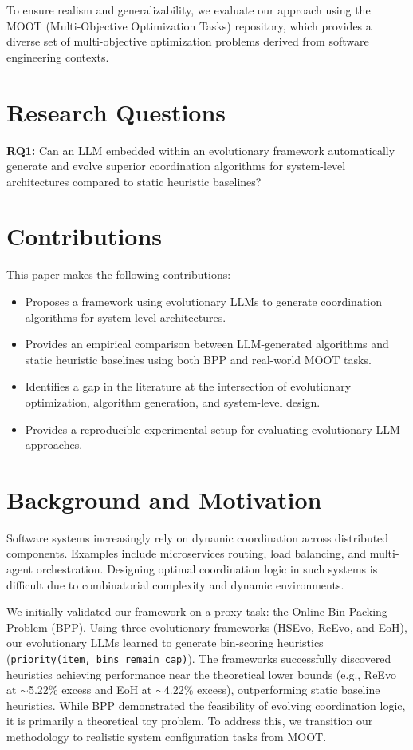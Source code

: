 \documentclass[sigconf,nonacm]{acmart}
\begin{document}
To ensure realism and generalizability, we evaluate our approach using the MOOT (Multi-Objective Optimization Tasks) repository, which provides a diverse set of multi-objective optimization problems derived from software engineering contexts.

\section{Research Questions}

\textbf{RQ1:} Can an LLM embedded within an evolutionary framework automatically generate and evolve superior coordination algorithms for system-level architectures compared to static heuristic baselines?

\section{Contributions}

This paper makes the following contributions:
\begin{itemize}
\item Proposes a framework using evolutionary LLMs to generate coordination algorithms for system-level architectures.
\item Provides an empirical comparison between LLM-generated algorithms and static heuristic baselines using both BPP and real-world MOOT tasks.
\item Identifies a gap in the literature at the intersection of evolutionary optimization, algorithm generation, and system-level design.
\item Provides a reproducible experimental setup for evaluating evolutionary LLM approaches.
\end{itemize}

\section{Background and Motivation}

Software systems increasingly rely on dynamic coordination across distributed components. Examples include microservices routing, load balancing, and multi-agent orchestration. Designing optimal coordination logic in such systems is difficult due to combinatorial complexity and dynamic environments.

We initially validated our framework on a proxy task: the Online Bin Packing Problem (BPP). Using three evolutionary frameworks (HSEvo, ReEvo, and EoH), our evolutionary LLMs learned to generate bin-scoring heuristics (\texttt{priority(item, bins\_remain\_cap)}). The frameworks successfully discovered heuristics achieving performance near the theoretical lower bounds (e.g., ReEvo at $\sim$5.22\% excess and EoH at $\sim$4.22\% excess), outperforming static baseline heuristics. While BPP demonstrated the feasibility of evolving coordination logic, it is primarily a theoretical toy problem. To address this, we transition our methodology to realistic system configuration tasks from MOOT.
\end{document}
